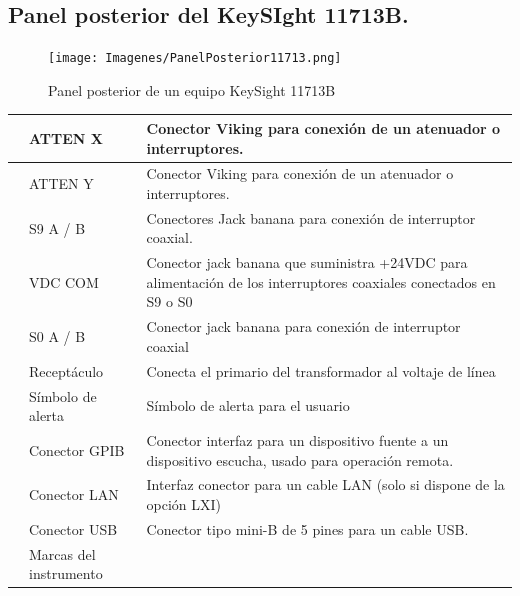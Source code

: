 \subsection{Panel posterior del KeySIght 11713B.}		

\begin{figure}
	\centering
	\begin{minipage}{17.404cm}
		\texttt{[image: Imagenes/PanelPosterior11713.png]}
		\caption{Panel posterior de un equipo KeySight 11713B}
		\label{Fig:PanelPosterioral11713}				
	\end{minipage}
\end{figure}

\begin{center}
	\tablefirsthead{}
	\tablehead{}
	\tabletail{}
	\tablelasttail{}
	\begin{supertabular}{|m{0.42300004cm}|m{3.6959999cm}|m{12.87cm}|}
		\hline
		 &
		\centering ATTEN X &
		\centering\arraybslash Conector Viking para conexión de un atenuador o interruptores.\\\hline
		 &
		\centering ATTEN Y &
		\centering\arraybslash Conector Viking para conexión de un atenuador o interruptores.\\\hline
		 &
		\centering S9 A / B &
		\centering\arraybslash Conectores Jack banana para conexión de interruptor coaxial.\\\hline
		 &
		 VDC COM &
		\centering\arraybslash Conector jack banana que suministra +24VDC para alimentación de los interruptores coaxiales
		conectados en S9 o S0\\\hline
		 &
		\centering S0 A / B &
		\centering\arraybslash Conector jack banana para conexión de interruptor coaxial\\\hline
		 &
		\centering Receptáculo &
		\centering\arraybslash Conecta el primario del transformador al voltaje de línea \\\hline
		 &
		\centering Símbolo de alerta &
		\centering\arraybslash Símbolo de alerta para el usuario\\\hline
		 &
		\centering Conector GPIB &
		\centering\arraybslash Conector interfaz para un dispositivo fuente a un dispositivo escucha, usado para operación
		remota.\\\hline
		 &
		\centering Conector LAN &
		\centering\arraybslash Interfaz conector para un cable LAN (solo si dispone de la opción LXI)\\\hline
		 &
		\centering Conector USB &
		\centering\arraybslash Conector tipo mini{}-B de 5 pines para un cable USB.\\\hline
		 &
		\centering Marcas del instrumento &
		~
		\\\hline
	\end{supertabular}
\end{center}

